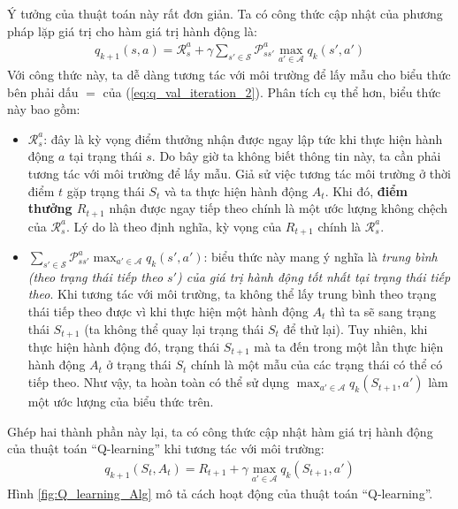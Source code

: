 Ý tưởng của thuật toán này rất đơn giản.
Ta có công thức cập nhật của phương pháp lặp giá trị cho hàm giá trị hành động là:
\begin{align}
	q_{k+1}(s,a) = \mathcal{R}_{s}^{a} + \gamma \sum_{s' \in \mathcal{S}} \mathcal{P}_{ss'}^{a} \max_{a' \in \mathcal{A}} q_{k}(s', a')
	\label{eq:q_val_iteration_2}
\end{align}
Với công thức này, ta dễ dàng tương tác với môi trường để lấy mẫu cho biểu thức bên phải dấu $=$ của (\ref{eq:q_val_iteration_2}).
Phân tích cụ thể hơn, biểu thức này bao gồm:
\begin{itemize}
	\item $\mathcal{R}_{s}^{a}$: đây là kỳ vọng điểm thưởng nhận được ngay lập tức khi thực hiện hành động $a$ tại trạng thái $s$.
	Do bây giờ ta không biết thông tin này, ta cần phải tương tác với môi trường để lấy mẫu.
	Giả sử việc tương tác môi trường ở thời điểm $t$ gặp trạng thái $S_t$ và ta thực hiện hành động $A_t$.
	Khi đó, \textbf{điểm thưởng $R_{t+1}$} nhận được ngay tiếp theo chính là một ước lượng không chệch của $\mathcal{R}_{s}^{a}$.
	Lý do là theo định nghĩa, kỳ vọng của $R_{t+1}$ chính là $\mathcal{R}_{s}^{a}$.
	
	\item $\sum_{s' \in \mathcal{S}} \mathcal{P}_{ss'}^{a} \max_{a' \in \mathcal{A}} q_{k}(s', a')$: biểu thức này mang ý nghĩa là \textit{trung bình (theo trạng thái tiếp theo $s'$) của giá trị hành động tốt nhất tại trạng thái tiếp theo}.
	Khi tương tác với môi trường, ta không thể lấy trung bình theo trạng thái tiếp theo được vì khi thực hiện một hành động $A_t$ thì ta sẽ sang trạng thái $S_{t+1}$ (ta không thể quay lại trạng thái $S_t$ để thử lại).
	Tuy nhiên, khi thực hiện hành động đó, trạng thái $S_{t+1}$ mà ta đến trong một lần thực hiện hành động $A_t$ ở trạng thái $S_t$ chính là một mẫu của các trạng thái có thể có tiếp theo.
	Như vậy, ta hoàn toàn có thể sử dụng $\max_{a' \in \mathcal{A}} q_{k}(S_{t+1}, a')$ làm một ước lượng của biểu thức trên.
\end{itemize}
Ghép hai thành phần này lại, ta có công thức cập nhật hàm giá trị hành động của thuật toán ``Q-learning'' khi tương tác với môi trường:
\begin{align}
	q_{k+1}(S_t,A_t) = R_{t+1} + \gamma \max_{a' \in \mathcal{A}} q_{k}(S_{t+1}, a')
	\label{eq:q_learning_update}
\end{align}
Hình \ref{fig:Q_learning_Alg} mô tả cách hoạt động của thuật toán ``Q-learning''.

